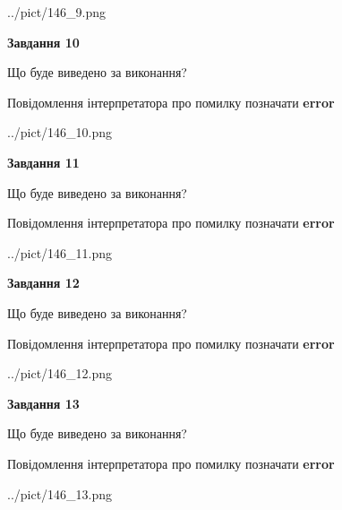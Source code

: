 \documentclass[11pt, ukrainian]{article}
\begin{document}
{\begin {large}
\begin{center}
	{../pict/146_9.png}
\end{center}
\newpage

{\begin {center}\textbf{Завдання 10}\end {center}}\par
Що буде виведено за виконання? \par
Повідомлення інтерпретатора про помилку позначати \textbf{error}

\begin{center}
	{../pict/146_10.png}
\end{center}
\newpage

{\begin {center}\textbf{Завдання 11}\end {center}}\par
Що буде виведено за виконання? \par
Повідомлення інтерпретатора про помилку позначати \textbf{error}

\begin{center}
	{../pict/146_11.png}
\end{center}
\newpage

{\begin {center}\textbf{Завдання 12}\end {center}}\par
Що буде виведено за виконання? \par
Повідомлення інтерпретатора про помилку позначати \textbf{error}

\begin{center}
	{../pict/146_12.png}
\end{center}
\newpage

{\begin {center}\textbf{Завдання 13}\end {center}}\par
Що буде виведено за виконання? \par
Повідомлення інтерпретатора про помилку позначати \textbf{error}

\begin{center}
	{../pict/146_13.png}
\end{center}
\newpage


\end{large}}
\end{document}
